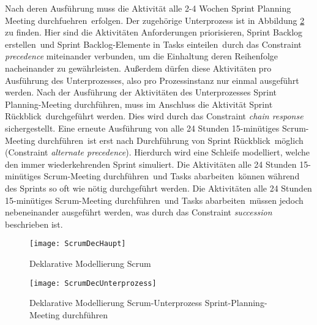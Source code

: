 Nach deren Ausführung muss die Aktivität \grqq alle 2-4 Wochen Sprint Planning Meeting durchfuehren\grqq \  erfolgen. Der zugehörige Unterprozess ist in Abbildung \ref{fig:ScrumDecUnterprozess} zu finden. Hier sind die Aktivitäten \grqq Anforderungen priorisieren\grqq, \grqq Sprint Backlog erstellen\grqq \ und \grqq Sprint Backlog-Elemente in Tasks einteilen\grqq \ durch das Constraint \textit{precedence} miteinander verbunden, um die Einhaltung deren Reihenfolge nacheinander zu gewährleisten. Außerdem dürfen diese Aktivitäten pro Ausführung des Unterprozesses, also pro Prozessinstanz nur einmal ausgeführt werden.\newline
Nach der Ausführung der Aktivitäten des Unterprozesses Sprint Planning-Meeting durchführen, muss im Anschluss die Aktivität \grqq Sprint Rückblick\grqq \ durchgeführt werden. Dies wird durch das Constraint \textit{chain response} sichergestellt. Eine erneute Ausführung von \grqq alle 24 Stunden 15-minütiges Scrum-Meeting durchführen\grqq \ ist erst nach Durchführung von \grqq Sprint Rückblick\grqq \ möglich (Constraint \textit{alternate precedence}). Hierdurch wird eine Schleife modelliert, welche den immer wiederkehrenden Sprint simuliert.\newline
Die Aktivitäten \grqq alle 24 Stunden 15-minütiges Scrum-Meeting durchführen\grqq \ und \grqq Tasks abarbeiten\grqq \ können während des Sprints so oft wie nötig durchgeführt werden. Die Aktivitäten \grqq alle 24 Stunden 15-minütiges Scrum-Meeting durchführen\grqq \ und \grqq Tasks abarbeiten\grqq \ müssen jedoch nebeneinander ausgeführt werden, was durch das Constraint \textit{succession} beschrieben ist. \newline


\begin{figure}[htp]
\begin{center}
  \texttt{[image: ScrumDecHaupt]} %
  \caption{Deklarative Modellierung Scrum}
  \label{fig:ScrumDecHaupt}
\end{center}
\end{figure}



\begin{figure}[htp]
\begin{center}
  \texttt{[image: ScrumDecUnterprozess]} %
  \caption{Deklarative Modellierung Scrum-Unterprozess Sprint-Planning-Meeting durchführen}
  \label{fig:ScrumDecUnterprozess}
\end{center}
\end{figure}
\clearpage

